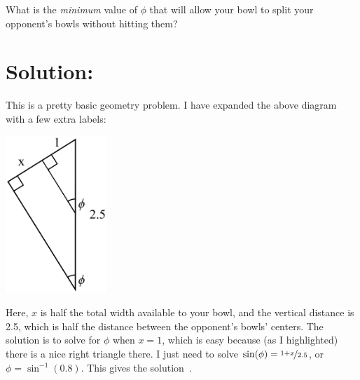 \documentclass{article}
\begin{document}
What is the \textit{minimum} value of $\phi$ that will allow your bowl to split your opponent's bowls without hitting them?

\section*{Solution:}

This is a pretty basic geometry problem.
I have expanded the above diagram with a few extra labels:

\vspace{0.15in}
\begin{center}
\includegraphics[width=1.5in]{bowls_diagram2.png}
\end{center}
\vspace{0.15in}

Here, $x$ is half the total width available to your bowl, and the vertical distance is 2.5, which is half the distance between the opponent's bowls' centers.
The solution is to solve for $\phi$ when $x=1$, which is easy because (as I highlighted) there is a nice right triangle there.
I just need to solve $\sin(\phi)=\nicefrac{1+x}{2.5}$, or $\phi=\sin^{-1}(0.8)$.
This gives the solution
\,.
\end{document}
